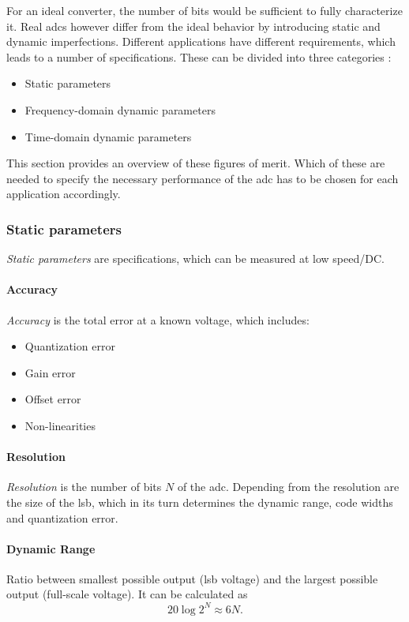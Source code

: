 For an ideal converter, the number of bits would be sufficient to fully characterize it.
Real \glspl{adc} however differ from the ideal behavior by introducing static and dynamic imperfections.
Different applications have different requirements, which leads to a number of specifications. These can be divided into three categories \cite{Lundberg}:
\begin{itemize}[noitemsep]
	\item Static parameters
	\item Frequency-domain dynamic parameters
	\item Time-domain dynamic parameters
\end{itemize}
This section provides an overview of these figures of merit. Which of these are needed to specify the necessary performance of the \gls{adc} has to be chosen for each application accordingly.


\subsubsection{Static parameters}
\textit{Static parameters} are specifications, which can be measured at low speed/DC. 
\paragraph{Accuracy}
\textit{Accuracy} is the total error at a known voltage, which includes:
\begin{itemize}[noitemsep]
	\item Quantization error
	\item Gain error
	\item Offset error
	\item Non-linearities
\end{itemize}

\paragraph{Resolution}
\textit{Resolution} is the number of bits $N$ of the \gls{adc}. Depending from the resolution are the size of the \gls{lsb}, which in its turn determines the dynamic range, code widths and quantization error.

\paragraph{Dynamic Range}
Ratio between smallest possible output (\gls{lsb} voltage) and the largest possible output (full-scale voltage). It can be calculated as
\begin{equation}
	20 \log 2^{N} \approx 6N.
\end{equation}


